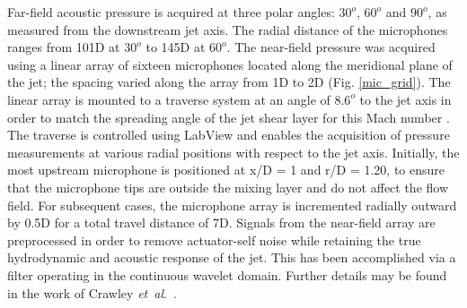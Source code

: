 \documentclass[english]{aiaa-tc}
\newcommand*{\etal}{\textit{et~al}.\ }
\begin{document}
Far-field acoustic pressure is acquired at three polar angles: $30^{o}$, $60^{o}$ and $90^{o}$, as measured from the downstream jet axis. 
The radial distance of the microphones ranges from 101D at $30^{o}$ to 145D at $60^{o}$. 
The near-field pressure was acquired using a linear array of sixteen microphones located along the meridional plane of the jet; the spacing varied along the array from 1D to 2D (Fig. \ref{mic_grid}). 
The linear array is mounted to a traverse system at an angle of $8.6^{o}$ to the jet axis in order to match the spreading angle of the jet shear layer for this Mach number \cite{kfm2009-1}. 
The traverse is controlled using LabView and enables the acquisition of pressure measurements at various radial positions with respect to the jet axis. 
Initially, the most upstream microphone is positioned at x/D = 1 and r/D = 1.20, to ensure that the microphone tips are outside the mixing layer and do not affect the flow field. 
For subsequent cases, the microphone array is incremented radially outward by 0.5D for a total travel distance of 7D. 
Signals from the near-field array are preprocessed in order to remove actuator-self noise while retaining the true hydrodynamic and acoustic response of the jet. 
This has been accomplished via a filter operating in the continuous wavelet domain. Further details may be found in the work of Crawley \etal \cite{Crawley2015}.
\end{document}
